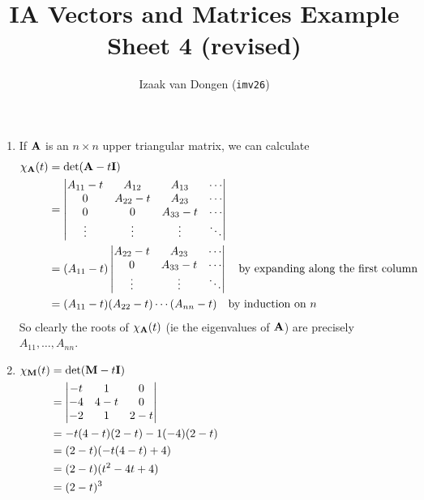 \documentclass[fleqn,a4paper,11pt]{article}
\title{IA Vectors and Matrices Example Sheet 4 (revised)}
\author{Izaak van Dongen (\texttt{imv26})}
\begin{document}
 \maketitle\thispagestyle{empty} %

 \begin{enumerate}[label=\textbf{\arabic*.}]
  \item
   If \(\mathbf{A}\) is an \(n \times n\) upper triangular matrix, we can calculate
   \begin{align*}
    \chi_{\mathbf{A}}(t)
     &= \det(\mathbf{A} - t \mathbf{I}) \\
     &=
      \begin{vmatrix}
       A_{11} - t & A_{12} & A_{13} & \dotsm \\
       0 & A_{22} - t & A_{23} & \dotsm \\
       0 & 0 & A_{33} - t & \dotsm \\
       \vdots & \vdots & \vdots & \ddots
      \end{vmatrix} \\
     &=
      (A_{11} - t)
      \begin{vmatrix}
       A_{22} - t & A_{23} & \dotsm \\
       0 & A_{33} - t & \dotsm \\
       \vdots & \vdots & \ddots
      \end{vmatrix} \quad \text{by expanding along the first column} \\
     &= (A_{11} - t)(A_{22} - t) \dotsm (A_{nn} - t)
      \quad \text{by induction on \(n\)}
   \end{align*}
   So clearly the roots of \(\chi_{\mathbf{A}}(t)\) (ie the eigenvalues of
   \(\mathbf{A}\)) are precisely \(A_{11}, \dotsc, A_{nn}\).
  \item \(
   \begin{aligned}[t]
    \chi_{\mathbf{M}}(t)
     &= \det(\mathbf{M} - t \mathbf{I}) \\
     &=
     \begin{vmatrix}
      -t & 1 & 0 \\
      -4 & 4 - t & 0 \\
      -2 & 1 & 2 - t
     \end{vmatrix} \\
     &= -t(4 - t)(2 - t) - 1(-4)(2 - t) \\
     &= (2 - t)( -t(4 - t) + 4) \\
     &= (2 - t)(t^2 - 4t + 4) \\
     &= (2 - t)^3
   \end{aligned} \)


\end{enumerate}
\end{document}
